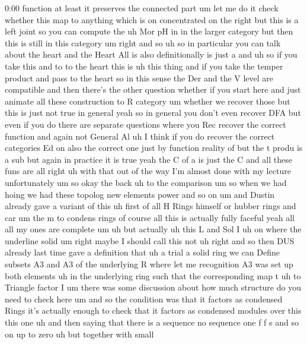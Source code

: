 \begin{unfinished}{0:00}
function  at  least  it  preserves  the
connected
part
um  let  me  do
it  check  whether  this  map  to  anything
which  is  on  concentrated  on  the  right
but  this  is  a  left  joint  so  you  can
compute
the  uh  Mor  pH
in  in  the  larger  category  but  then  this
is  still  in  this
category  um  right  and
so  uh
so  in  particular  you  can  talk  about  the
heart  and  the  Heart  All  is  also
definitionally  is  just
a
and
uh
so  if  you  take  this  and  to  to  the  heart
this  is
uh  this  thing  and  if  you  take  the  temper
product  and  pass  to  the
heart  so  in  this  sense  the  Der  and  the  V
level  are  compatible  and  then  there's
the  other  question  whether  if  you  start
here  and  just  animate  all  these
construction  to  R  category  um  whether  we
recover  those  but  this  is  just  not  true
in  general  yeah  so  in  general  you  don't
even  recover  DFA  but  even  if  you  do
there  are  separate  questions  where  you
Rec  recover  the  correct  function  and
again  not
General  Al  uh  I  think  if  you  do  recover
the  correct  categories  Ed  on  also  the
correct  one  just  by  function  reality
of
but  the  t  produ  is  a
sub  but  again  in
practice  it  is  true
yeah  the  C  of  a  is  just  the  C  and  all
these  funs  are
all
right  uh  with  that  out  of  the  way  I'm
almost  done  with  my  lecture
unfortunately
um
so
okay  the  back  uh  to  the
comparison  um  so  when  we  had  hoing  we
had  these  topolog  new  elements  power  and
so  on  um  and  Dustin  already  gave  a
variant  of  this  uh  first  of  all  H  Rings
himself  or  hubber  rings  and  car
um  the  m  to  condens  rings  of  course
all  this  is  actually  fully  faceful  yeah
all  all  my  ones  are  complete
um  uh  but
actually  uh  this  L  and
Sol
I
uh  on  where  the
underline
solid  um
right  maybe  I  should  call  this
not  uh  right  and  so  then  DUS  already
last  time  gave  a  definition  that  uh  a
trial  a  solid
ring
we  can
Define  subsets  A3  and
A3  of  the  underlying
R  where  let  me
recognition  A3  was  set  up  both
elements
uh
in  the  underlying  ring  such  that  the
corresponding
map
t  uh
to
Triangle  factor
I  um  there  was  some  discussion  about  how
much  structure  do  you  need  to  check  here
um  and  so  the  condition  was  that  it
factors  as  condensed  Rings  it's  actually
enough  to  check  that  it  factors  as
condensed  modules  over  this  this  one  uh
and  then  saying  that  there  is  a  sequence
no  sequence  one  f  f  s  and  so  on  up  to
zero  uh  but  together  with  small

\end{unfinished}
